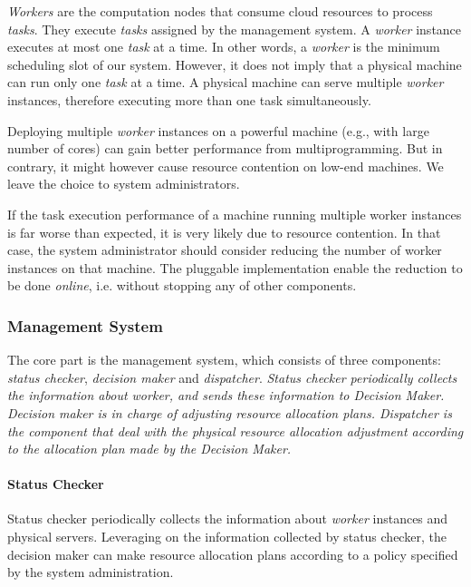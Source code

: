 \emph{Workers} are the computation nodes that consume cloud resources 
to process \emph{tasks}.
They execute \emph{tasks} assigned by the management system.
A \emph{worker} instance executes at most one \emph{task} at a time.
In other words, a \emph{worker} is the minimum scheduling slot of our 
system.
However, it does not imply that a physical machine can run only one 
\emph{task} at a time.
A physical machine can serve multiple \emph{worker} instances, 
therefore executing more than one task simultaneously.

Deploying multiple \emph{worker} instances on a powerful machine (e.g.,
with large number of cores) can gain better performance from 
multiprogramming.
But in contrary, it might however cause resource contention on low-end 
machines.
We leave the choice to system administrators.

If the task execution performance of a machine running multiple worker
instances is far worse than expected, it is very likely due to resource
contention.
In that case, the system administrator should consider reducing the
number of worker instances on that machine.
The pluggable implementation enable the reduction to be done \emph{
online}, i.e. without stopping any of other components.


\subsubsection{Management System}	%

The core part is the management system, which consists of three
components: \emph{status checker}, \emph{decision maker} and
\emph{dispatcher}.  
\em{Status checker} periodically collects the information about \emph{
worker}, and sends these information to \em{Decision Maker}.
\em{Decision maker} is in charge of adjusting resource allocation plans.
\em{Dispatcher} is the component that deal with the physical resource
allocation adjustment according to the allocation plan made by the
\em{Decision Maker}.


\paragraph{Status Checker}	%

Status checker periodically collects the information about \emph{worker}
instances and physical servers.
Leveraging on the information collected by status checker, the decision
maker can make resource allocation plans according to a policy specified
by the system administration.


